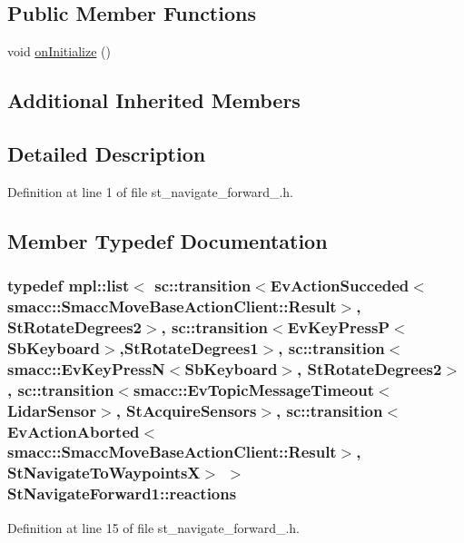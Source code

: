 \subsection*{Public Member Functions}
\begin{DoxyCompactItemize}
\item 
void \hyperlink{structStNavigateForward1_a49134dde57b432385db0ba37201434e0}{on\+Initialize} ()
\end{DoxyCompactItemize}
\subsection*{Additional Inherited Members}


\subsection{Detailed Description}


Definition at line 1 of file st\+\_\+navigate\+\_\+forward\+\_.\+h.



\subsection{Member Typedef Documentation}
\subsubsection[{\texorpdfstring{reactions}{reactions}}]{\setlength{\rightskip}{0pt plus 5cm}typedef mpl\+::list$<$ sc\+::transition$<$Ev\+Action\+Succeded$<$smacc\+::\+Smacc\+Move\+Base\+Action\+Client\+::\+Result$>$, {\bf St\+Rotate\+Degrees2}$>$, sc\+::transition$<$Ev\+Key\+PressP$<$Sb\+Keyboard$>$,{\bf St\+Rotate\+Degrees1}$>$, sc\+::transition$<${\bf smacc\+::\+Ev\+Key\+PressN}$<$Sb\+Keyboard$>$, {\bf St\+Rotate\+Degrees2}$>$, sc\+::transition$<${\bf smacc\+::\+Ev\+Topic\+Message\+Timeout}$<${\bf Lidar\+Sensor}$>$, {\bf St\+Acquire\+Sensors}$>$, sc\+::transition$<$Ev\+Action\+Aborted$<$smacc\+::\+Smacc\+Move\+Base\+Action\+Client\+::\+Result$>$, {\bf St\+Navigate\+To\+WaypointsX}$>$ $>$ {\bf St\+Navigate\+Forward1\+::reactions}}\hypertarget{structStNavigateForward1_a9f249e99bd15cb030021ff692ea8269c}{}\label{structStNavigateForward1_a9f249e99bd15cb030021ff692ea8269c}


Definition at line 15 of file st\+\_\+navigate\+\_\+forward\+\_.\+h.



